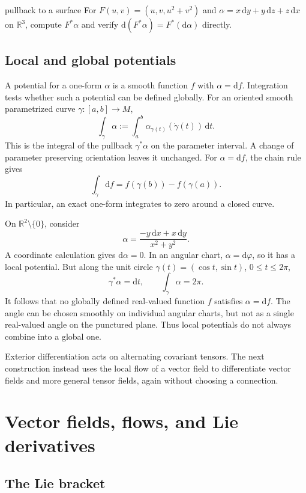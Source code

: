 \documentclass[11pt,a4paper]{article}
\numberwithin{equation}{section}
\newcommand{\R}{\mathbb R}
\newcommand{\dd}{\mathrm d}
\newcommand{\slideref}[1]{\par\nobreak\smallskip\nobreak{\footnotesize\color{ink!60}\textsc{Source slide #1}}\par\nobreak\smallskip\nobreak}
\begin{document}
\begin{studentwork}[4.0cm]{pullback to a surface}
For \(F(u,v)=(u,v,u^2+v^2)\) and
\(\alpha=x\,\dd y+y\,\dd z+z\,\dd x\) on \(\R^3\), compute
\(F^*\alpha\) and verify \(\dd(F^*\alpha)=F^*(\dd\alpha)\) directly.
\end{studentwork}

\subsection{Local and global potentials}

A potential for a one-form \(\alpha\) is a smooth function \(f\) with
\(\alpha=\dd f\). Integration tests whether such a potential can be
defined globally. For an oriented smooth parametrized curve
\(\gamma:[a,b]\to M\),
\[
 \int_\gamma\alpha
 :=\int_a^b\alpha_{\gamma(t)}(\dot\gamma(t))\,\dd t.
\]
This is the integral of the pullback \(\gamma^*\alpha\) on the parameter
interval. A change of parameter preserving orientation leaves it
unchanged. For \(\alpha=\dd f\), the chain rule gives
\[
 \int_\gamma\dd f=f(\gamma(b))-f(\gamma(a)).
\]
In particular, an exact one-form integrates to zero around a closed curve.

On \(\R^2\setminus\{0\}\), consider
\[
 \alpha=\frac{-y\,\dd x+x\,\dd y}{x^2+y^2}.
\]
A coordinate calculation gives \(\dd\alpha=0\). In an angular chart,
\(\alpha=\dd\varphi\), so it has a local potential. But along the unit
circle \(\gamma(t)=(\cos t,\sin t)\), \(0\leq t\leq2\pi\),
\[
 \gamma^*\alpha=\dd t,\qquad \int_\gamma\alpha=2\pi.
\]
It follows that no globally defined real-valued function \(f\) satisfies
\(\alpha=\dd f\). The angle can be chosen smoothly on individual
angular charts, but not as a single real-valued angle on the punctured
plane. Thus local potentials do not always combine into a global one.

Exterior differentiation acts on alternating covariant tensors.
The next construction instead uses the local flow of a vector field
to differentiate vector fields and more general tensor fields, again
without choosing a connection.

\section{Vector fields, flows, and Lie derivatives}
\label{sec:lie}
\slideref{17}

\subsection{The Lie bracket}
\end{document}
